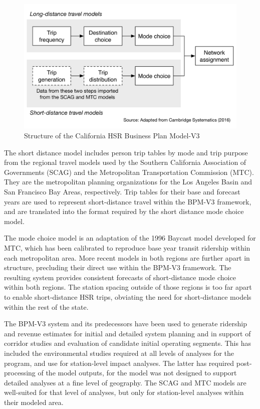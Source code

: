 \begin{figure}   %
\centering
\includegraphics[scale=0.575]{graphics/56-bpm-v3}
\caption{Structure of the California HSR Business Plan Model-V3}
\label{fig:bpm-v3}
\end{figure}

The short distance model includes person trip tables by mode and trip purpose from the regional travel models used by the Southern California Association of Governments (SCAG) and the Metropolitan Transportation Commission (MTC). They are the metropolitan planning organizations for the Los Angeles Basin and San Francisco Bay Areas, respectively. Trip tables for their base and forecast years are used to represent short-distance travel within the BPM-V3 framework, and are translated into the format required by the short distance mode choice model.

The mode choice model is an adaptation of the 1996 Baycast model developed for MTC, which has been calibrated to reproduce base year transit ridership within each metropolitan area. More recent models in both regions are further apart in structure, precluding their direct use within the BPM-V3 framework. The resulting system provides consistent forecasts of short-distance mode choice within both regions. The station spacing outside of those regions is too far apart to enable short-distance HSR trips, obviating the need for short-distance models within the rest of the state.

The BPM-V3 system and its predecessors have been used to generate ridership and revenue estimates for initial and detailed system planning and in support of corridor studies and evaluation of candidate initial operating segments. This has included the environmental studies required at all levels of analyses for the program, and use for station-level impact analyses. The latter has required post-processing of the model outputs, for the model was not designed to support detailed analyses at a fine level of geography. The SCAG and MTC models are well-suited for that level of analyses, but only for station-level analyses within their modeled area. 

